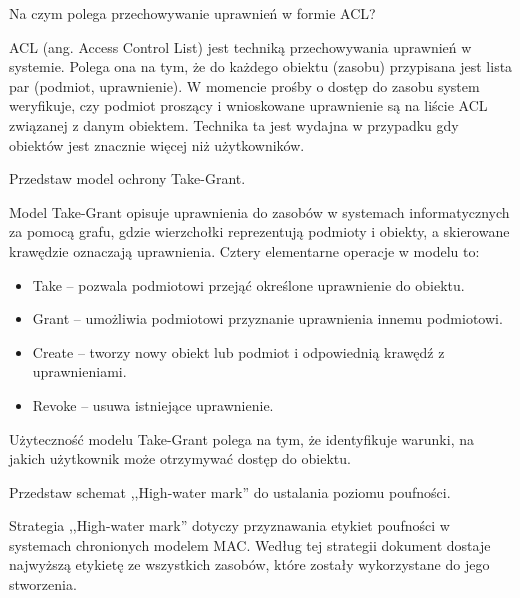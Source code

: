 \documentclass[answers,11pt]{exam}
\begin{document}
\begin{questions}
\question Na czym polega przechowywanie uprawnień w formie ACL?
\begin{solution}
ACL (ang. Access Control List) jest techniką przechowywania uprawnień w systemie. Polega ona na tym, że do każdego obiektu (zasobu) przypisana jest lista par (podmiot, uprawnienie). W momencie prośby o dostęp do zasobu system weryfikuje, czy podmiot proszący i wnioskowane uprawnienie są na liście ACL związanej z danym obiektem. Technika ta jest wydajna w przypadku gdy obiektów jest znacznie więcej niż użytkowników.
\end{solution}

\question Przedstaw model ochrony Take-Grant.
\begin{solution}
Model Take-Grant opisuje uprawnienia do zasobów w systemach informatycznych za pomocą grafu, gdzie wierzchołki reprezentują podmioty i obiekty, a skierowane krawędzie oznaczają uprawnienia. Cztery elementarne operacje w modelu to:
\begin{itemize}
\item Take – pozwala podmiotowi przejąć określone uprawnienie do obiektu.
\item Grant – umożliwia podmiotowi przyznanie uprawnienia innemu podmiotowi.
\item Create – tworzy nowy obiekt lub podmiot i odpowiednią krawędź z uprawnieniami.
\item Revoke – usuwa istniejące uprawnienie.
\end{itemize}
Użyteczność modelu Take-Grant polega na tym, że identyfikuje warunki, na jakich użytkownik może otrzymywać dostęp do obiektu.
\end{solution}

\question Przedstaw schemat ,,High-water mark'' do ustalania poziomu poufności.
\begin{solution}
Strategia ,,High-water mark'' dotyczy przyznawania etykiet poufności w systemach chronionych modelem MAC. Według tej strategii dokument dostaje najwyższą etykietę ze wszystkich zasobów, które zostały wykorzystane do jego stworzenia.
\end{solution}


\end{questions}

\end{document}
